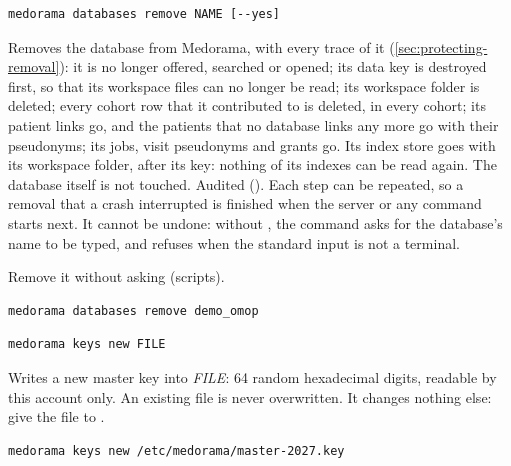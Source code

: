 \begin{lstlisting}[style=signature]
medorama databases remove NAME [--yes]
\end{lstlisting}
Removes the database from Medorama, with every trace of it (\cref{sec:protecting-removal}): it is
no longer offered, searched or opened; its data key is destroyed first, so that its workspace
files can no longer be read; its workspace folder is deleted; every cohort row that it
contributed to is deleted, in every cohort; its patient links go, and the patients that no
database links any more go with their pseudonyms; its jobs, visit pseudonyms and grants go. Its index
store goes with its workspace folder, after its key: nothing of its indexes can be read again. The database itself is not touched.
Audited (). Each step can be repeated, so a removal that a crash interrupted is
finished when the server or any command starts next. It cannot be undone: without ,
the command asks for the database's name to be typed, and refuses when the standard input is
not a terminal.
\begin{params}
\item[--yes] Remove it without asking (scripts).
\end{params}
\begin{lstlisting}[style=shell]
medorama databases remove demo_omop
\end{lstlisting}

\begin{lstlisting}[style=signature]
medorama keys new FILE
\end{lstlisting}
Writes a new master key into \textit{FILE}: 64 random hexadecimal digits, readable by this
account only. An existing file is never overwritten. It changes nothing else: give the file to
.
\begin{lstlisting}[style=shell]
medorama keys new /etc/medorama/master-2027.key
\end{lstlisting}

